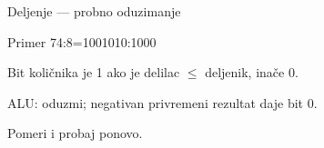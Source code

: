 
\begin{frame}[label=05-s054]{Deljenje — probno oduzimanje}
\fontsize{10}{12}\selectfont\setlength{\parskip}{0pt}

Primer 74:8=1001010:1000
\begin{center}\end{center}
Bit količnika je 1 ako je delilac $\leq$ deljenik, inače 0.\par
ALU: oduzmi; negativan privremeni rezultat daje bit 0.\par
Pomeri i probaj ponovo.
\end{frame}
